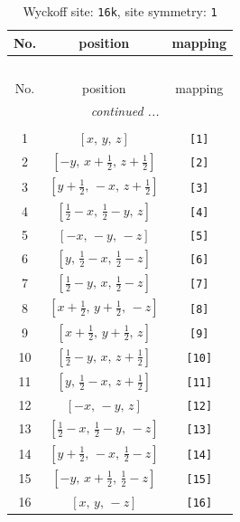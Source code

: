 \documentclass[fleqn,8pt]{jsarticle}
\begin{document}
\begin{longtable}{ccc}
\caption{Wyckoff site: {\tt 16k}, site symmetry: {\tt 1}}
 \\
 \hline \hline
No. & position & mapping \\ \hline \endfirsthead

\multicolumn{2}{l}{\tablename\ \thetable{}} \\
 \hline \hline
No. & position & mapping \\ \hline \endhead

 \hline \hline
\multicolumn{2}{r}{\footnotesize\it continued ...} \\ \endfoot

 \hline \hline
\multicolumn{2}{r}{} \\ \endlastfoot

1 & $\left[ x,\, y,\, z \right]$ & {\tt [1]} \\ \hline
2 & $\left[ - y,\, x + \frac{1}{2},\, z + \frac{1}{2} \right]$ & {\tt [2]} \\ \hline
3 & $\left[ y + \frac{1}{2},\, - x,\, z + \frac{1}{2} \right]$ & {\tt [3]} \\ \hline
4 & $\left[ \frac{1}{2} - x,\, \frac{1}{2} - y,\, z \right]$ & {\tt [4]} \\ \hline
5 & $\left[ - x,\, - y,\, - z \right]$ & {\tt [5]} \\ \hline
6 & $\left[ y,\, \frac{1}{2} - x,\, \frac{1}{2} - z \right]$ & {\tt [6]} \\ \hline
7 & $\left[ \frac{1}{2} - y,\, x,\, \frac{1}{2} - z \right]$ & {\tt [7]} \\ \hline
8 & $\left[ x + \frac{1}{2},\, y + \frac{1}{2},\, - z \right]$ & {\tt [8]} \\ \hline
9 & $\left[ x + \frac{1}{2},\, y + \frac{1}{2},\, z \right]$ & {\tt [9]} \\ \hline
10 & $\left[ \frac{1}{2} - y,\, x,\, z + \frac{1}{2} \right]$ & {\tt [10]} \\ \hline
11 & $\left[ y,\, \frac{1}{2} - x,\, z + \frac{1}{2} \right]$ & {\tt [11]} \\ \hline
12 & $\left[ - x,\, - y,\, z \right]$ & {\tt [12]} \\ \hline
13 & $\left[ \frac{1}{2} - x,\, \frac{1}{2} - y,\, - z \right]$ & {\tt [13]} \\ \hline
14 & $\left[ y + \frac{1}{2},\, - x,\, \frac{1}{2} - z \right]$ & {\tt [14]} \\ \hline
15 & $\left[ - y,\, x + \frac{1}{2},\, \frac{1}{2} - z \right]$ & {\tt [15]} \\ \hline
16 & $\left[ x,\, y,\, - z \right]$ & {\tt [16]} \\
\end{longtable}
\end{document}
